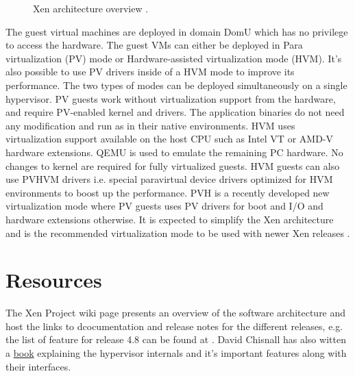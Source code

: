 \documentclass[9pt,twocolumn,twoside]{styles/osajnl}
\begin{document}
\begin{figure}[htbp]
	\centering
	\caption{Xen architecture overview \cite{www-xen-arch-diag}.}
	\label{fig:xen-arch}
\end{figure}

The guest virtual machines are deployed in domain DomU which has no privilege to access the hardware. The guest VMs can either be deployed in Para virtualization (PV) mode or Hardware-assisted virtualization mode (HVM). It's also possible to use PV drivers inside of a HVM mode to improve its performance. The two types of modes can be deployed simultaneously  on a single hypervisor. PV guests work without virtualization support from the hardware, and require PV-enabled kernel and drivers. The application binaries do not need any modification and run as in their native environments.  HVM uses virtualization support available on the host CPU such as Intel VT or AMD-V hardware extensions. QEMU is used to emulate the remaining PC hardware. No changes to kernel are required for fully virtualized guests. HVM guests can also use PVHVM drivers i.e. special  paravirtual device drivers optimized for HVM environments to boost up the performance. PVH is a recently developed new virtualization mode where  PV guests uses PV drivers for boot and I/O and hardware extensions otherwise. It is expected to simplify the Xen architecture and is the recommended virtualization mode to be used with newer Xen releases \cite{www-xen-pvh}. 

\section{Resources}

The Xen Project wiki page presents an overview of the software architecture and host the links to dcocumentation and release notes for the different releases, e.g. the list of feature for release 4.8 can be found at \cite{www-xen-4.8-release-note}. David Chisnall has also witten a \href{http://www.informit.com/store/definitive-guide-to-the-xen-hypervisor-9780133582499} {book} explaining the hypervisor internals and it's important features along with their interfaces. 
\end{document}
